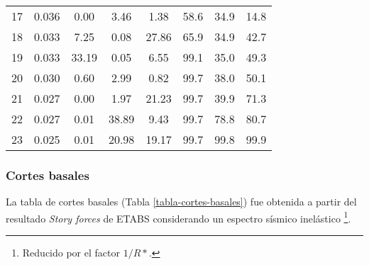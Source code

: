 \begin{longtable}{cccccccc}
    17    & 0.036 & 0.00  & 3.46  & 1.38  & 58.6  & 34.9  & 14.8 \\
    18    & 0.033 & 7.25  & 0.08  & 27.86 & 65.9  & 34.9  & 42.7 \\
    \rowcolor[rgb]{ .851,  .851,  .851} 19    & 0.033 & 33.19 & 0.05  & 6.55  & 99.1  & 35.0  & 49.3 \\
    20    & 0.030 & 0.60  & 2.99  & 0.82  & 99.7  & 38.0  & 50.1 \\
    21    & 0.027 & 0.00  & 1.97  & 21.23 & 99.7  & 39.9  & 71.3 \\
    \rowcolor[rgb]{ .851,  .851,  .851} 22    & 0.027 & 0.01  & 38.89 & 9.43  & 99.7  & 78.8  & 80.7 \\
    23    & 0.025 & 0.01  & 20.98 & 19.17 & 99.7  & 99.8  & 99.9 \bigstrut[b]\\
\hline
\end{longtable}

\newpage
\subsubsection{Cortes basales}

La tabla de cortes basales (Tabla \ref{tabla-cortes-basales}) fue obtenida a partir del resultado \textit{Story forces} de ETABS considerando un espectro sísmico inelástico \footnote{Reducido por el factor $1/R*$.}.

